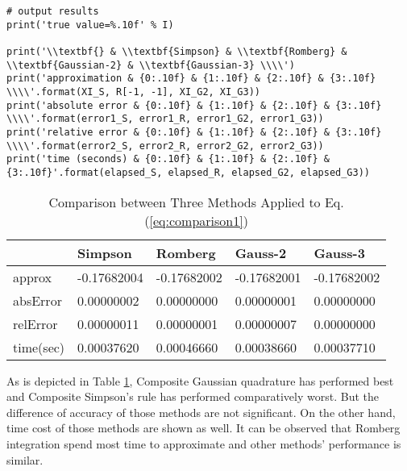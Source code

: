 \documentclass[preprint,12pt]{elsarticle}
\begin{document}
\begin{lstlisting}
# output results
print('true value=%.10f' % I)

print('\\textbf{} & \\textbf{Simpson} & \\textbf{Romberg} & \\textbf{Gaussian-2} & \\textbf{Gaussian-3} \\\\')
print('approximation & {0:.10f} & {1:.10f} & {2:.10f} & {3:.10f} \\\\'.format(XI_S, R[-1, -1], XI_G2, XI_G3))
print('absolute error & {0:.10f} & {1:.10f} & {2:.10f} & {3:.10f} \\\\'.format(error1_S, error1_R, error1_G2, error1_G3))
print('relative error & {0:.10f} & {1:.10f} & {2:.10f} & {3:.10f} \\\\'.format(error2_S, error2_R, error2_G2, error2_G3))
print('time (seconds) & {0:.10f} & {1:.10f} & {2:.10f} & {3:.10f}'.format(elapsed_S, elapsed_R, elapsed_G2, elapsed_G3))
\end{lstlisting}

\begin{table}[h]
\centering
\begin{tabular}{l|l l l l}
 & \textbf{Simpson} & \textbf{Romberg} & \textbf{Gauss-2} & \textbf{Gauss-3} \\
\hline
approx & -0.17682004 & -0.17682002 & -0.17682001 & -0.17682002 \\
absError & 0.00000002 & 0.00000000 & 0.00000001 & 0.00000000 \\
relError & 0.00000011 & 0.00000001 & 0.00000007 & 0.00000000 \\
time(sec) & 0.00037620 & 0.00046660 & 0.00038660 & 0.00037710
\end{tabular}
\caption{Comparison between Three Methods Applied to Eq. (\ref{eq:comparison1})}
\label{tab:comparison1}
\end{table}

As is depicted in Table \ref{tab:comparison1}, Composite Gaussian quadrature has performed best and Composite Simpson's rule has performed comparatively worst. But the difference of accuracy of those methods are not significant. On the other hand, time cost of those methods are shown as well. It can be observed that Romberg integration spend most time to approximate and other methods' performance is similar.
\end{document}
